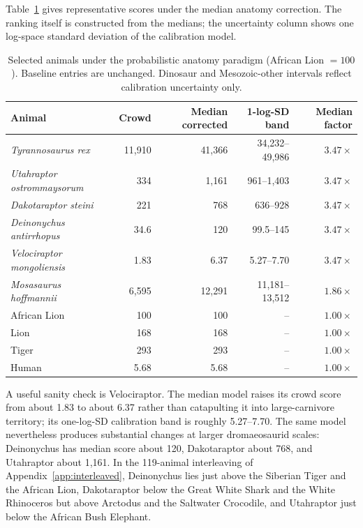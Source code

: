 \documentclass[11pt]{article}
\begin{document}
Table~\ref{tab:rescaled} gives representative scores under the median anatomy correction. The ranking itself is constructed from the medians; the uncertainty column shows one log-space standard deviation of the calibration model.

\begin{table}[H]
\centering
\small
\begin{tabular}{lrrrr}
\toprule
Animal & Crowd & Median corrected & 1-log-SD band & Median factor \\
\midrule
\textit{Tyrannosaurus rex} & 11,910 & 41,366 & 34,232--49,986 & $3.47\times$ \\
\textit{Utahraptor ostrommaysorum} & 334 & 1,161 & 961--1,403 & $3.47\times$ \\
\textit{Dakotaraptor steini} & 221 & 768 & 636--928 & $3.47\times$ \\
\textit{Deinonychus antirrhopus} & 34.6 & 120 & 99.5--145 & $3.47\times$ \\
\textit{Velociraptor mongoliensis} & 1.83 & 6.37 & 5.27--7.70 & $3.47\times$ \\
\textit{Mosasaurus hoffmannii} & 6,595 & 12,291 & 11,181--13,512 & $1.86\times$ \\
African Lion & 100 & 100 & -- & $1.00\times$ \\
Lion & 168 & 168 & -- & $1.00\times$ \\
Tiger & 293 & 293 & -- & $1.00\times$ \\
Human & 5.68 & 5.68 & -- & $1.00\times$ \\
\bottomrule
\end{tabular}
\caption{Selected animals under the probabilistic anatomy paradigm (African Lion $=100$). Baseline entries are unchanged. Dinosaur and Mesozoic-other intervals reflect calibration uncertainty only.}
\label{tab:rescaled}
\end{table}

A useful sanity check is Velociraptor. The median model raises its crowd score from about 1.83 to about 6.37 rather than catapulting it into large-carnivore territory; its one-log-SD calibration band is roughly 5.27--7.70. The same model nevertheless produces substantial changes at larger dromaeosaurid scales: Deinonychus has median score about 120, Dakotaraptor about 768, and Utahraptor about 1,161. In the 119-animal interleaving of Appendix~\ref{app:interleaved}, Deinonychus lies just above the Siberian Tiger and the African Lion, Dakotaraptor below the Great White Shark and the White Rhinoceros but above Arctodus and the Saltwater Crocodile, and Utahraptor just below the African Bush Elephant.
\end{document}
